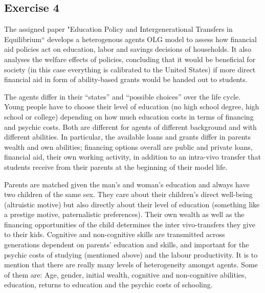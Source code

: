 \documentclass[12pt,a4paper,xcolor=dvipsnames]{article}
\begin{document}
\subsection*{Exercise 4}
The assigned paper "Education Policy and Intergenerational Transfers in Equilibrium“ develops a heterogenous agents OLG model to assess how financial aid policies act on education, labor and savings decisions of households. It also analyses the welfare effects of policies, concluding that it would be beneficial for society (in this case everything is calibrated to the United States) if more direct financial aid in form of ability-based grants would be handed out to students. 

The agents differ in their “states” and “possible choices” over the life cycle. Young people have to choose their level of education (no high school degree, high school or college) depending on how much education costs in terms of financing and psychic costs. Both are different for agents of different background and with different abilities. In particular, the available loans and grants differ in parents wealth and own abilities; financing options overall are public and private loans, financial aid, their own working activity, in addition to an intra-vivo transfer that students receive from their parents at the beginning of their model life. 

Parents are matched given the man’s and woman’s education and always have two children of the same sex. They care about their children’s direct well-being (altruistic motive) but also directly about their level of education (something like a prestige motive, paternalistic preferences). Their own wealth as well as the financing opportunities of the child determines the inter vivo-transfers they give to their kids. Cognitive and non-cognitive skills are transmitted across generations dependent on parents’ education and skills, and important for the psychic costs of studying (mentioned above) and the labour productivity. 
It is to mention that there are really many levels of heterogeneity amongst agents. Some of them are: Age, gender, initial wealth, cognitive and non-cognitive abilities, education, returns to education and the psychic costs of schooling.
\end{document}
